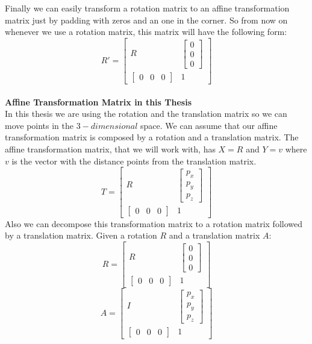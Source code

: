 Finally we can easily transform a rotation matrix to an affine transformation matrix just by padding with zeros and an one in the corner. So from now on whenever we use a rotation matrix, this matrix will have the following form:
\[
R' = 
\begin{bmatrix}
R &  \begin{bmatrix} 0\\0\\0 \end{bmatrix}\\
\begin{bmatrix}
0 & 0 & 0
\end{bmatrix} & 1
\end{bmatrix}
\]
\\

\textbf{Affine Transformation Matrix in this Thesis}\\
In this thesis we are using the rotation and the translation matrix so we can move points in the \(3-dimensional\) space. We can assume that our affine transformation matrix is composed by a rotation and a translation matrix. The affine transformation matrix, that we will work with, has \(X = R\) and \(Y = v\) where \(v\) is the vector with the distance points from the translation matrix.
\[
T = 
\begin{bmatrix}
R &  \begin{bmatrix} p_x\\p_y\\p_z \end{bmatrix}\\
\begin{bmatrix}
0 & 0 & 0
\end{bmatrix} & 1
\end{bmatrix}
\] 
Also we can decompose this transformation matrix to a rotation matrix followed by a translation matrix. Given a rotation \(R\) and a translation matrix \(A\):
\[R = 
\begin{bmatrix}
R &  \begin{bmatrix} 0\\0\\0 \end{bmatrix}\\
\begin{bmatrix}
0 & 0 & 0
\end{bmatrix} & 1
\end{bmatrix}
\]
\[A = 
\begin{bmatrix}
I &  \begin{bmatrix} p_x\\p_y\\p_z \end{bmatrix}\\
\begin{bmatrix}
0 & 0 & 0
\end{bmatrix} & 1
\end{bmatrix}
\]
